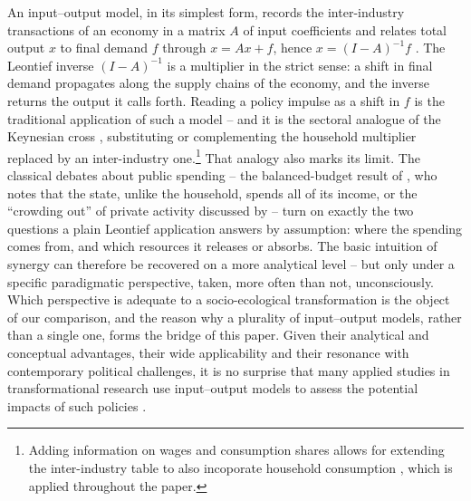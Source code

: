 An input--output model, in its simplest form, records the inter-industry transactions of an economy in a matrix $A$ of input coefficients and relates total output $x$ to final demand $f$ through $x = Ax + f$, hence $x = (I-A)^{-1}f$ \citep{Leontief.1936, leontief1986input, BlairMiller}. The Leontief inverse $(I-A)^{-1}$ is a multiplier in the strict sense: a shift in final demand propagates along the supply chains of the economy, and the inverse returns the output it calls forth. Reading a policy impulse as a shift in $f$ is the traditional application of such a model -- and it is the sectoral analogue of the Keynesian cross \citep{Keynes.1936}, substituting or complementing the household multiplier replaced by an inter-industry one.\footnote{Adding information on wages and consumption shares allows for extending the inter-industry table to also incoporate household consumption \citep[ch.~6]{BlairMiller}, which is applied throughout the paper.} That analogy also marks its limit. The classical debates about public spending -- the balanced-budget result of \citet{Haavelmo.1945}, who notes that the state, unlike the household, spends all of its income, or the ``crowding out'' of private activity discussed by \citet{BlinderSolow.1973} -- turn on exactly the two questions a plain Leontief application answers by assumption: where the spending comes from, and which resources it releases or absorbs. The basic intuition of synergy can therefore be recovered on a more analytical level -- but only under a specific paradigmatic perspective, taken, more often than not, unconsciously. Which perspective is adequate to a socio-ecological transformation is the object of our comparison, and the reason why a plurality of input--output models, rather than a single one, forms the bridge of this paper. Given their analytical and conceptual advantages, their wide applicability and their resonance with contemporary political challenges, it is no surprise that many applied studies in transformational research use input--output models to assess the potential impacts of such policies \citep{Garrett.2017, Hornykewycz.2025, Markandya.2016, Markaki.2013}.

